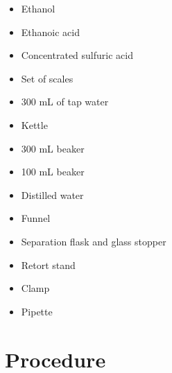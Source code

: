 \documentclass[a4paper,11pt]{article}
\begin{document}
\begin{itemize}
\item Ethanol
\item Ethanoic acid
\item Concentrated sulfuric acid
\item Set of scales
\item 300 mL of tap water
\item Kettle
\item 300 mL beaker
\item 100 mL beaker
\item Distilled water
\item Funnel
\item Separation flask and glass stopper
\item Retort stand
\item Clamp
\item Pipette
\end{itemize}


\section{Procedure}
\end{document}
